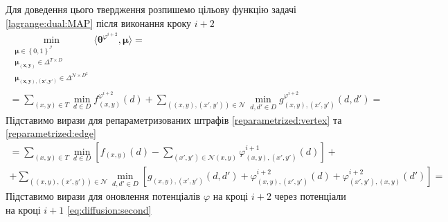 Для доведення цього твердження розпишемо цільову функцію задачі
\eqref{lagrange:dual:MAP} після виконання кроку $i + 2$
\begin{equation*}
\begin{gathered}
    \min \limits_{\substack{\pmb{\mu} \in \left\{ 0, 1 \right\}^{\mathcal{I}} \\
                            \pmb{\mu_{\left(x, y \right)}} \in \Delta^{T \times D} \\
                            \pmb{\mu_{\left(x, y \right), \left(x', y' \right)}} \in
                                \Delta^{\mathcal{N} \times D^2}}}
        \langle \pmb{\theta}^{\varphi^{i + 2}}, \pmb{\mu} \rangle = \\
    = \sum \limits_{\left(x, y \right) \in T}
        \min \limits_{d \in D}
            f_{\left(x, y \right)}^{\varphi^{i + 2}} \left( d \right) +
    \sum \limits_{\left( \left(x, y \right), \left(x', y' \right) \right) \in \mathcal{N}}
        \min \limits_{d, d' \in D}
            g_{\left(x, y \right), \left(x', y' \right)}^{\varphi^{i + 2}}
                \left( d, d' \right) =
\end{gathered}
\end{equation*}
Підставимо вирази для репараметризованих штрафів \eqref{reparametrized:vertex}
та \eqref{reparametrized:edge}
\begin{equation*}
\begin{gathered}
    = \sum \limits_{\left(x, y \right) \in T}
        \min \limits_{d \in D} \left[
            f_{\left(x, y \right)} \left(d \right) -
            \sum \limits_{\left(x', y' \right) \in \mathcal{N} \left(x, y \right)}
                \varphi_{\left(x, y \right), \left(x', y' \right)}^{i + 1}
                    \left( d \right)
        \right] + \\
    + \sum \limits_{\left(\left(x, y \right), \left(x', y' \right) \right) \in  \mathcal{N}}
        \min \limits_{d, d' \in D} \left[
            g_{\left(x, y \right), \left(x', y' \right)} \left(d, d' \right) +
            \varphi_{\left(x, y \right), \left(x', y' \right)}^{i + 2}
                \left( d \right) +
            \varphi_{\left(x', y' \right), \left(x, y \right)}^{i + 2}
                \left( d' \right)
        \right] =
\end{gathered}
\end{equation*}
Підставимо вирази для оновлення потенціалів $\varphi$ на кроці $i + 2$
через потенціали на кроці $i + 1$ \eqref{eq:diffusion:second}
